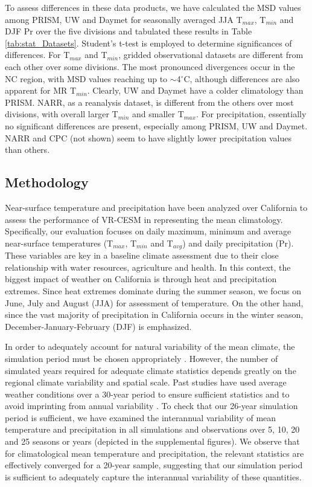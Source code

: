 \documentclass[ms]{agutex}   %
\begin{document}
\begin{article}
To assess differences in these data products, we have calculated the MSD values among PRISM, UW and Daymet for seasonally averaged JJA T$_{max}$, T$_{min}$ and DJF Pr over the five divisions and tabulated these results in Table \ref{tab:stat_Datasets}. Student's t-test is employed to determine significances of differences. For T$_{max}$ and T$_{min}$, gridded observational datasets are different from each other over some divisions.  The most pronounced divergences occur in the NC region, with MSD values reaching up to $\sim$4$^\circ$C, although differences are also apparent for MR T$_{min}$. Clearly, UW and Daymet have a colder climatology than PRISM. NARR, as a reanalysis dataset, is different from the others over most divisions, with overall larger T$_{min}$ and smaller T$_{max}$. For precipitation, essentially no significant differences are present, especially among PRISM, UW and Daymet. NARR and CPC (not shown) seem to have slightly lower precipitation values than others.

\subsection{Methodology}

Near-surface temperature and precipitation have been analyzed over California to assess the performance of VR-CESM in representing the mean climatology. Specifically, our evaluation focuses on daily maximum, minimum and average near-surface temperatures (T$_{max}$, T$_{min}$ and T$_{avg}$) and daily precipitation (Pr). These variables are key in a baseline climate assessment due to their close relationship with water resources, agriculture and health. In this context, the biggest impact of weather on California is through heat and precipitation extremes. Since heat extremes dominate during the summer season, we focus on June, July and August (JJA) for assessment of temperature. On the other hand, since the vast majority of precipitation in California occurs in the winter season, December-January-February (DJF) is emphasized.  

In order to adequately account for natural variability of the mean climate, the simulation period must be chosen appropriately \citep{solomon2007climate}. However, the number of simulated years required for adequate climate statistics depends greatly on the regional climate variability and spatial scale. Past studies have used average weather conditions over a 30-year period to ensure sufficient statistics and to avoid imprinting from annual variability \citep{dinse2009climate}. To check that our 26-year simulation period is sufficient, we have examined the interannual variability of mean temperature and precipitation in all simulations and observations over 5, 10, 20 and 25 seasons or years (depicted in the supplemental figures). We observe that for climatological mean temperature and precipitation, the relevant statistics are effectively converged for a 20-year sample, suggesting that our simulation period is sufficient to adequately capture the interannual variability of these quantities. 



\end{article}
\end{document}

